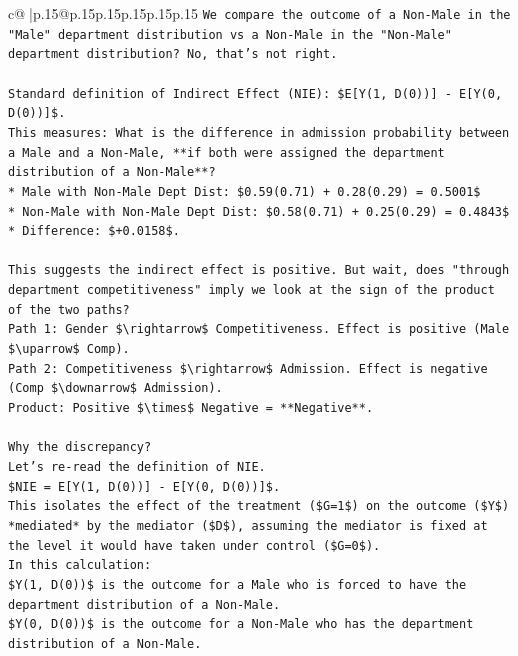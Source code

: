 \documentclass{article}
\begin{document}
{\begin{supertabular}{c@{$\;$}|p{.15\linewidth}@{}p{.15\linewidth}p{.15\linewidth}p{.15\linewidth}p{.15\linewidth}p{.15\linewidth}}
{{{\texttt{We compare the outcome of a Non{-}Male in the "Male" department distribution vs a Non{-}Male in the "Non{-}Male" department distribution? No, that's not right.} \\
\\ 
\texttt{Standard definition of Indirect Effect (NIE): \$E{[}Y(1, D(0)){]} {-} E{[}Y(0, D(0)){]}\$.} \\
\texttt{This measures: What is the difference in admission probability between a Male and a Non{-}Male, **if both were assigned the department distribution of a Non{-}Male**?} \\
\texttt{*   Male with Non{-}Male Dept Dist: \$0.59(0.71) + 0.28(0.29) = 0.5001\$} \\
\texttt{*   Non{-}Male with Non{-}Male Dept Dist: \$0.58(0.71) + 0.25(0.29) = 0.4843\$} \\
\texttt{*   Difference: \$+0.0158\$.} \\
\\ 
\texttt{This suggests the indirect effect is positive. But wait, does "through department competitiveness" imply we look at the sign of the product of the two paths?} \\
\texttt{Path 1: Gender \$\textbackslash{}rightarrow\$ Competitiveness. Effect is positive (Male \$\textbackslash{}uparrow\$ Comp).} \\
\texttt{Path 2: Competitiveness \$\textbackslash{}rightarrow\$ Admission. Effect is negative (Comp \$\textbackslash{}downarrow\$ Admission).} \\
\texttt{Product: Positive \$\textbackslash{}times\$ Negative = **Negative**.} \\
\\ 
\texttt{Why the discrepancy?} \\
\texttt{Let's re{-}read the definition of NIE.} \\
\texttt{\$NIE = E{[}Y(1, D(0)){]} {-} E{[}Y(0, D(0)){]}\$.} \\
\texttt{This isolates the effect of the treatment (\$G=1\$) on the outcome (\$Y\$) *mediated* by the mediator (\$D\$), assuming the mediator is fixed at the level it would have taken under control (\$G=0\$).} \\
\texttt{In this calculation:} \\
\texttt{\$Y(1, D(0))\$ is the outcome for a Male who is forced to have the department distribution of a Non{-}Male.} \\
\texttt{\$Y(0, D(0))\$ is the outcome for a Non{-}Male who has the department distribution of a Non{-}Male.} \\
}}}
\end{supertabular}}
\end{document}
